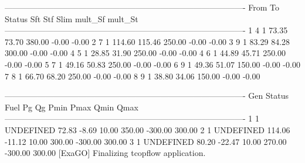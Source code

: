 ----------------------------------------------------------------------------------------
From       To       Status     Sft      Stf     Slim     mult_Sf  mult_St 
----------------------------------------------------------------------------------------
1          4          1       73.35    73.70   380.00    -0.00    -0.00
2          7          1      114.60   115.46   250.00    -0.00    -0.00
3          9          1       83.29    84.28   300.00    -0.00    -0.00
4          5          1       28.85    31.90   250.00    -0.00    -0.00
4          6          1       44.89    45.71   250.00    -0.00    -0.00
5          7          1       49.16    50.83   250.00    -0.00    -0.00
6          9          1       49.36    51.07   150.00    -0.00    -0.00
7          8          1       66.70    68.20   250.00    -0.00    -0.00
8          9          1       38.80    34.06   150.00    -0.00    -0.00

----------------------------------------------------------------------------------------
Gen      Status     Fuel     Pg       Qg       Pmin     Pmax     Qmin     Qmax  
----------------------------------------------------------------------------------------
1          1    UNDEFINED    72.83    -8.69    10.00   350.00  -300.00   300.00
2          1    UNDEFINED   114.06   -11.12    10.00   300.00  -300.00   300.00
3          1    UNDEFINED    80.20   -22.47    10.00   270.00  -300.00   300.00
[ExaGO] Finalizing tcopflow application.
